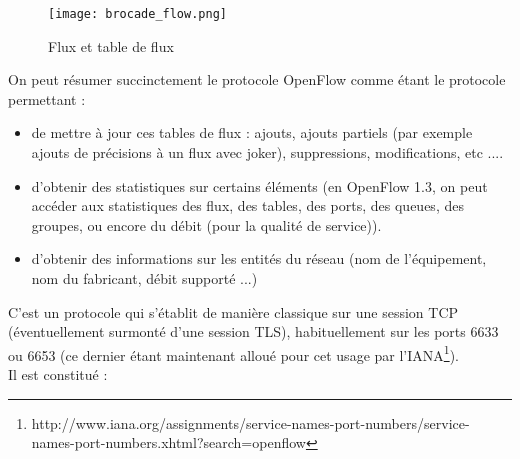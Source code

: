 \begin{figure}[h]
  	\centering
  	\texttt{[image: brocade\_flow.png]}
  	\caption{Flux et table de flux}
\end{figure}

On peut résumer succinctement le protocole OpenFlow comme étant le protocole permettant :
\begin{itemize}

\item de mettre à jour ces tables de flux : ajouts, ajouts partiels (par exemple ajouts de précisions à un flux avec joker), suppressions, modifications, etc ....  

\item d'obtenir des statistiques sur certains éléments (en OpenFlow 1.3, on peut accéder aux statistiques des flux, des tables, des ports, des queues, des groupes, ou encore du débit (pour la qualité de service)).

\item d'obtenir des informations sur les entités du réseau (nom de l'équipement, nom du fabricant, débit supporté ...)

\end{itemize}

C'est un protocole qui s'établit de manière classique sur une session TCP (éventuellement surmonté d'une session TLS), habituellement sur les ports 6633 ou 6653 (ce dernier étant maintenant alloué pour cet usage par l'IANA\footnote{http://www.iana.org/assignments/service-names-port-numbers/service-names-port-numbers.xhtml?search=openflow}).\\
Il est constitué :

